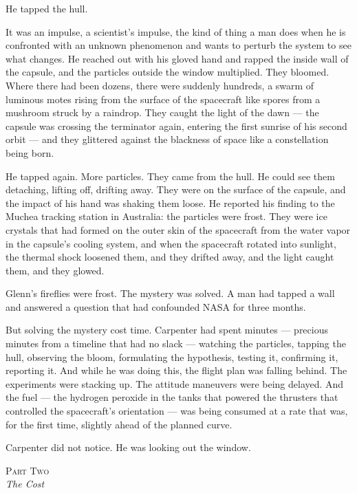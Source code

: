 \documentclass[12pt, letterpaper]{article}
\begin{document}
He tapped the hull.

It was an impulse, a scientist's impulse, the kind of thing a man does when he is confronted with an unknown phenomenon and wants to perturb the system to see what changes. He reached out with his gloved hand and rapped the inside wall of the capsule, and the particles outside the window multiplied. They bloomed. Where there had been dozens, there were suddenly hundreds, a swarm of luminous motes rising from the surface of the spacecraft like spores from a mushroom struck by a raindrop. They caught the light of the dawn --- the capsule was crossing the terminator again, entering the first sunrise of his second orbit --- and they glittered against the blackness of space like a constellation being born.

He tapped again. More particles. They came from the hull. He could see them detaching, lifting off, drifting away. They were on the surface of the capsule, and the impact of his hand was shaking them loose. He reported his finding to the Muchea tracking station in Australia: the particles were frost. They were ice crystals that had formed on the outer skin of the spacecraft from the water vapor in the capsule's cooling system, and when the spacecraft rotated into sunlight, the thermal shock loosened them, and they drifted away, and the light caught them, and they glowed.

Glenn's fireflies were frost. The mystery was solved. A man had tapped a wall and answered a question that had confounded NASA for three months.

But solving the mystery cost time. Carpenter had spent minutes --- precious minutes from a timeline that had no slack --- watching the particles, tapping the hull, observing the bloom, formulating the hypothesis, testing it, confirming it, reporting it. And while he was doing this, the flight plan was falling behind. The experiments were stacking up. The attitude maneuvers were being delayed. And the fuel --- the hydrogen peroxide in the tanks that powered the thrusters that controlled the spacecraft's orientation --- was being consumed at a rate that was, for the first time, slightly ahead of the planned curve.

Carpenter did not notice. He was looking out the window.

\begin{center}
{\small\textsc{Part Two}}\\[0.3em]
{\large\textit{The Cost}}
\end{center}
\end{document}
